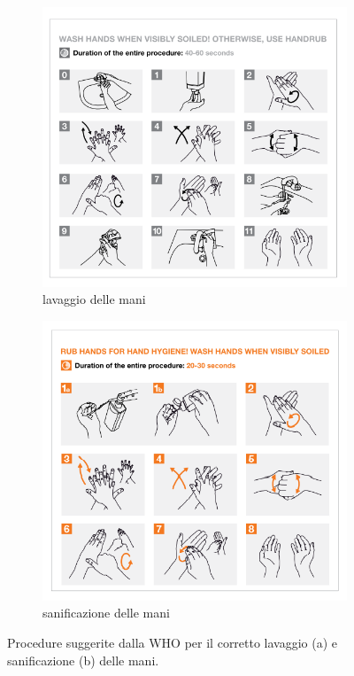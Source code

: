 \begin{figure}[!htb]
    \centering
    \begin{subfigure}{.45\textwidth}
        \includegraphics[width=\textwidth]{figure/handwash.png}
        \caption{lavaggio delle mani}
        \label{fig:handwash}
    \end{subfigure}
    \begin{subfigure}{.45\textwidth}
        \includegraphics[width=\textwidth]{figure/handsan.png}
        \caption{sanificazione delle mani}
        \label{fig:handsan}
    \end{subfigure}
    \caption{Procedure suggerite dalla WHO per il corretto lavaggio (a) e sanificazione (b) delle mani.}
    \label{fig:who-steps}
\end{figure}

